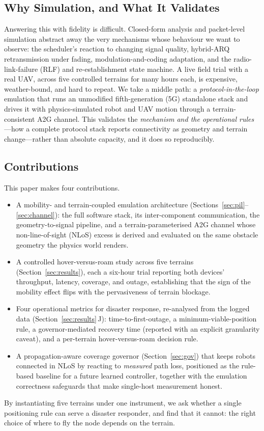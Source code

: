 \documentclass[conference]{IEEEtran}
\begin{document}
\subsection{Why Simulation, and What It Validates}
Answering this with fidelity is difficult. Closed-form analysis and packet-level
simulation abstract away the very mechanisms whose behaviour we want to observe: the
scheduler's reaction to changing signal quality, hybrid-ARQ retransmission under
fading, modulation-and-coding adaptation, and the radio-link-failure (RLF) and
re-establishment state machine. A live field trial with a real UAV, across five
controlled terrains for many hours each, is expensive, weather-bound, and hard to
repeat. We take a middle path: a \emph{protocol-in-the-loop} emulation that runs an
unmodified fifth-generation (5G) standalone stack and drives it with
physics-simulated robot and UAV motion through a terrain-consistent A2G channel. This
validates the \emph{mechanism and the operational rules}---how a complete protocol
stack reports connectivity as geometry and terrain change---rather than absolute
capacity, and it does so reproducibly.

\subsection{Contributions}
This paper makes four contributions.
\begin{itemize}
\item A mobility- and terrain-coupled emulation architecture
(Sections~\ref{sec:pil}--\ref{sec:channel}): the full software stack, its
inter-component communication, the geometry-to-signal pipeline, and a
terrain-parameterised A2G channel whose non-line-of-sight (NLoS) excess is derived and
evaluated on the same obstacle geometry the physics world renders.
\item A controlled hover-versus-roam study across five terrains
(Section~\ref{sec:results}), each a six-hour trial reporting both devices'
throughput, latency, coverage, and outage, establishing that the sign of the mobility
effect flips with the pervasiveness of terrain blockage.
\item Four operational metrics for disaster response, re-analysed from the logged
data (Section~\ref{sec:results}\,J): time-to-first-outage, a minimum-viable-position
rule, a governor-mediated recovery time (reported with an explicit
granularity caveat), and a per-terrain hover-versus-roam decision rule.
\item A propagation-aware coverage governor (Section~\ref{sec:gov}) that keeps robots
connected in NLoS by reacting to \emph{measured} path loss, positioned as the
rule-based baseline for a future learned controller, together with the emulation
correctness safeguards that make single-host measurement honest.
\end{itemize}
By instantiating five terrains under one instrument, we ask whether a single
positioning rule can serve a disaster responder, and find that it cannot: the right
choice of where to fly the node depends on the terrain.
\end{document}
